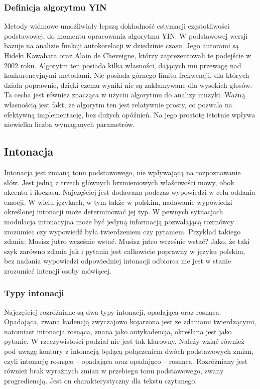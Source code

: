 \documentclass[a4paper,12 pt]{article}
\begin{document}
\subsubsection{Definicja algorytmu YIN}

Metody widmowe umożliwiały lepszą dokładność estymacji częstotliwości podstawowej, do momentu opracowania algorytmu YIN. W podstawowej wersji bazuje na analizie funkcji autokorelacji w dziedzinie czasu. Jego autorami są Hideki Kawahara oraz Alain de Cheveigne, którzy zaprezentowali te podejście w 2002 roku. Algorytm ten posiada kilka własności, dających mu przewagę nad konkurencyjnymi metodami. Nie posiada górnego limitu frekwencji, dla których działa poprawnie, dzięki czemu wyniki nie są zakłamywane dla wysokich głosów. Ta cecha jest również znacząca w użyciu algorytmu do analizy muzyki. Ważną własnością jest fakt, że algorytm ten jest relatywnie prosty, co pozwala na efektywną implementację, bez dużych opóźnień. Na jego prostotę istotnie wpływa niewielka liczba wymaganych parametrów.






\subsection{Intonacja}
Intonacja jest zmianą tonu podstawowego, nie wpływającą na rozpoznawanie słów. Jest jedną z trzech głównych brzmieniowych właściwości mowy, obok akcentu i iloczasu. Najczęściej jest dodawana podczas wypowiedzi w celu oddania emocji. W wielu językach, w tym także w polskim, nadawanie wypowiedzi określonej intonacji może determinować jej typ. W pewnych sytuacjach modulacja intonacyjna może być jedyną informacją pozwalającą rozmówcy zrozumiec czy wypowiedź była twierdzeniem czy pytaniem. 
Przykład takiego zdania:
\newline Musisz jutro wcześnie wstać.
\newline Musisz jutro wcześnie wstać?
\newline Jako, że taki szyk zarówno zdania jak i pytania jest całkowicie poprawny w języku polskim, bez nadania wypowiedzi odpowiedniej intonacji odbiorca nie jest w stanie zrozumieć intencji osoby mówiącej.

\subsubsection{Typy intonacji}
Najczęściej rozróżniane są dwa typy intonacji, opadająca oraz rosnąca. Opadająca, zwana kadencją zwyczajowo kojarzona jest ze zdaniami twierdzącymi, natomiast intonacja rosnąca, znana jako antykadencja, określana jest jako pytanie. W rzeczywistości podział nie jest tak klarowny. Należy wziąć również pod uwagę kontury z intonacją będącą połączeniem dwóch podstawowych zmian, czyli intonację rosnąco – opadająca oraz opadająco – rosnąca. Rozróżniany jest również brak wyraźnych zmian w przebiegu tonu podstawowego, zwany progrediencją. Jest on charakterystyczny dla tekstu czytanego.
\end{document}
